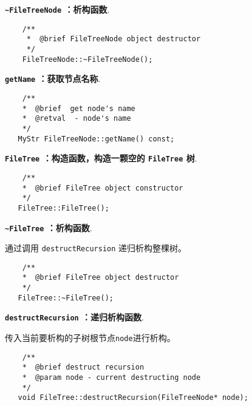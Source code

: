 \documentclass[a4paper]{ctexart}
\begin{document}
\noindent \textbf{\texttt{\textasciitilde FileTreeNode} ：析构函数}.

\begin{lstlisting}
    /**
     *  @brief FileTreeNode object destructor
     */
    FileTreeNode::~FileTreeNode();
\end{lstlisting}

\vspace{2.5em}

\noindent \textbf{\texttt{getName} ：获取节点名称}.

\begin{lstlisting}
    /**
    *  @brief  get node's name
    *  @retval  - node's name
    */
   MyStr FileTreeNode::getName() const;
\end{lstlisting}

\vspace{2.5em}


\noindent \textbf{\texttt{FileTree} ：构造函数，构造一颗空的 \texttt{FileTree} 树}.

\begin{lstlisting}
    /**
    *  @brief FileTree object constructor
    */
   FileTree::FileTree();
\end{lstlisting}

\vspace{2.5em}

\noindent \textbf{\texttt{\textasciitilde FileTree} ：析构函数}.

通过调用 \texttt{destructRecursion} 递归析构整棵树。

\begin{lstlisting}
    /**
    *  @brief FileTree object destructor
    */
   FileTree::~FileTree();
\end{lstlisting}

\vspace{2.5em}

\noindent \textbf{\texttt{destructRecursion} ：递归析构函数}.

传入当前要析构的子树根节点\texttt{node}进行析构。

\begin{lstlisting}
    /**
    *  @brief destruct recursion
    *  @param node - current destructing node
    */
   void FileTree::destructRecursion(FileTreeNode* node);
\end{lstlisting}

\vspace{3em}
\end{document}
